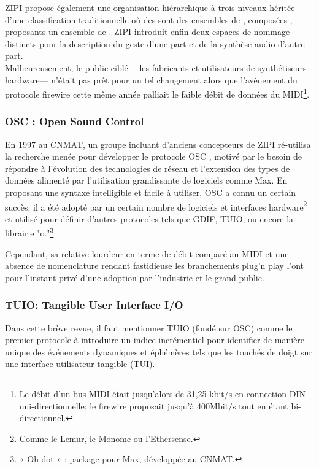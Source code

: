ZIPI propose également une organisation hiérarchique à trois niveaux héritée d'une classification traditionnelle où des  sont des ensembles de , composées , proposants un ensemble de . ZIPI introduit enfin deux espaces de nommage distincts pour la description du geste d'une part et de la synthèse audio d'autre part.\\
Malheureusement, le public ciblé —les fabricants et utilisateurs de synthétiseurs hardware— n'était pas prêt pour un tel changement alors que l'avènement du protocole \gls{firewire} cette même année palliait le faible débit de données du \gls{MIDI}\footnote{ Le débit d'un bus \gls{MIDI} était jusqu'alors de 31,25 kbit/s en connection DIN uni-directionnelle; le \gls{firewire} proposait jusqu'à 400Mbit/s tout en étant bi-directionnel.}.

\subsubsection{OSC : Open Sound Control}
En 1997 au \gls{CNMAT}, un groupe incluant d'anciens concepteurs de ZIPI ré-utilisa la recherche menée pour développer le protocole \gls{OSC} \cite{wright_open_1997}, motivé par le besoin de répondre à l'évolution des technologies de réseau et l'extension des types de données alimenté par l'utilisation grandissante de logiciels comme Max. En proposant une syntaxe intelligible et facile à utiliser, \gls{OSC} a connu un certain succès: il a été adopté par un certain nombre de logiciels et interfaces hardware\footnote{ Comme le Lemur, le Monome ou l'Ethersense.} et utilisé pour définir d'autres protocoles tels que \gls{GDIF}, \gls{TUIO}, ou encore la librairie "o."\footnote{ « Oh dot » : package pour Max, développée au \gls{CNMAT}.}.

Cependant, sa relative lourdeur en terme de débit comparé au \gls{MIDI} \cite{fraietta_open_2008} et une absence de nomenclature rendant fastidieuse les branchements plug'n play l'ont pour l'instant privé d'une adoption par l'industrie et le grand public.

\subsubsection{TUIO: Tangible User Interface I/O}
Dans cette brève revue, il faut mentionner \gls{TUIO} \cite{kaltenbrunner_tuio:_2005} (fondé sur \gls{OSC}) comme le premier protocole à introduire un indice incrémentiel pour identifier de manière unique des événements dynamiques et éphémères tels que les touchés de doigt sur une interface utilisateur tangible (\gls{TUI}).


